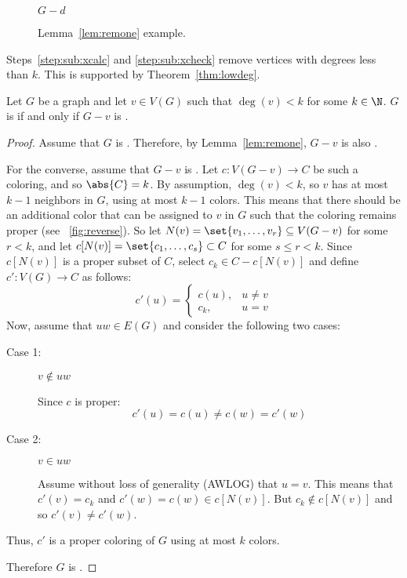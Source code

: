 \begin{figure}[H]
\begin{minipage}{1.25in}
    \(G-d\)
  \end{minipage}
  \caption{Lemma~\ref{lem:remone} example.}
  \label{fig:remone}
\end{figure}

Steps~\ref{step:sub:xcalc} and \ref{step:sub:xcheck} remove vertices with degrees less than \(k\).  This is
supported by Theorem~\ref{thm:lowdeg}.

\begin{theorem}
  \label{thm:lowdeg}
  Let \(G\) be a graph and let \(v\in V(G)\) such that \(\deg(v)<k\) for some \(k\in\N\).  \(G\) is 
  if and only if \(G-v\) is .
\end{theorem}

\begin{proof}
  Assume that \(G\) is .  Therefore, by Lemma~\ref{lem:remone}, \(G-v\) is also .

  For the converse, assume that \(G-v\) is .  Let \(c:V(G-v)\to C\) be such a coloring, and so
  \(\abs{C}=k\).  By assumption, \(\deg(v)<k\), so \(v\) has at most \(k-1\) neighbors in \(G\), using at most
  \(k-1\) colors.  This means that there should be an additional color that can be assigned to \(v\) in \(G\) such
  that the coloring remains proper (see \figurename~\ref{fig:reverse}).  So let
  \(N(v)=\set{v_1,\ldots,v_r}\subseteq V(G-v)\) for some \(r<k\), and let \(c[N(v)]=\set{c_1,\ldots,c_s}\subset C\)
  for some \(s\le r<k\).  Since \(c[N(v)]\) is a proper subset of \(C\), select \(c_k\in C-c[N(v)]\) and define
  \(c':V(G)\to C\) as follows:
  \[c'(u)=\begin{cases}
  c(u), & u\ne v \\
  c_k, & u=v
  \end{cases}\]
  Now, assume that \(uw\in E(G)\) and consider the following two cases:
  \begin{description}
  \item[Case 1:] \(v\notin uw\)

    Since \(c\) is proper:
    \[c'(u)=c(u)\ne c(w)=c'(w)\]
  \item[Case 2:] \(v\in uw\)

    Assume without loss of generality (AWLOG) that \(u=v\).  This means that \(c'(v)=c_k\) and \(c'(w)=c(w)\in
    c[N(v)]\).  But \(c_k\notin c[N(v)]\) and so \(c'(v)\ne c'(w)\).
  \end{description}
  Thus, \(c'\) is a proper coloring of \(G\) using at most \(k\) colors.

  Therefore \(G\) is .
\end{proof}

